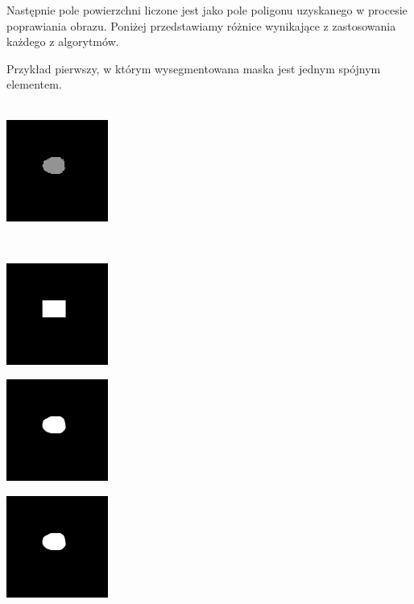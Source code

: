 \documentclass[a4paper,11pt,twoside]{report}
\theoremstyle{definition}
\begin{document}
Następnie pole powierzchni liczone jest jako pole poligonu uzyskanego w procesie poprawiania obrazu. Poniżej przedstawiamy różnice wynikające z zastosowania każdego z algorytmów.

Przykład pierwszy, w którym wysegmentowana maska jest jednym spójnym elementem. \\ \\
\begin{minipage}{\linewidth}
	\centering
	\includegraphics[width=0.25\textwidth]{Mask/1/maska.png}
\end{minipage}
\\
\begin{minipage}{\linewidth}
	\centering
	\includegraphics[width=0.25\textwidth]{Mask/1/square.png}
\end{minipage}
\begin{minipage}{\linewidth}
	\centering
	\includegraphics[width=0.25\textwidth]{Mask/1/hull.png}
\end{minipage}
\begin{minipage}{\linewidth}
	\centering
	\includegraphics[width=0.25\textwidth]{Mask/1/hull.png}
\end{minipage}
\end{document}

